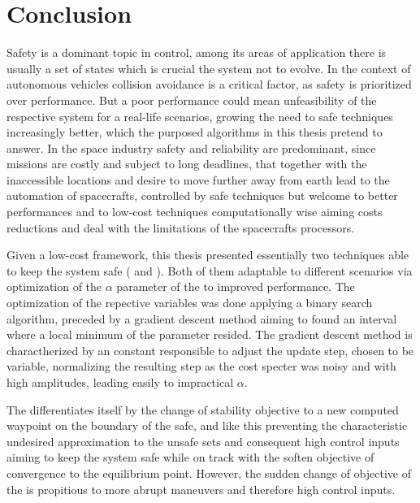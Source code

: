 
%

\chapter{Conclusion}
\label{cha:conclusion}

Safety is a dominant topic in control, among its areas of application there is usually a set of states which is crucial the system not to evolve. In the context of autonomous vehicles collision avoidance is a critical factor, as safety is prioritized over performance. But a poor performance could mean unfeasibility of the respective system for a real-life scenarios, growing the need to safe techniques increasingly better, which the purposed algorithms in this thesis pretend to answer. In the space industry safety and reliability are predominant, since missions are costly and subject to long deadlines, that together with the inaccessible locations and desire to move further away from earth lead to the automation of spacecrafts, controlled by safe techniques but welcome to better performances and to low-cost techniques computationally wise aiming costs reductions and deal with the limitations of the spacecrafts processors.


Given a low-cost  framework, this thesis presented essentially two techniques able to keep the system safe ( and ). Both of them adaptable to different scenarios via optimization of the \(\alpha\) parameter of the  to improved performance. The optimization of the repective variables was done applying a binary search algorithm, preceded by a gradient descent method aiming to found an interval where a local minimum of the parameter resided. The gradient descent method is charactherized by an constant responsible to adjust the update step, chosen to be variable, normalizing the resulting step as the cost specter was noisy and with high amplitudes, leading easily to impractical \(\alpha\). 


The  differentiates itself by the change of stability objective to a new computed waypoint on the boundary of the safe, and like this preventing the characteristic  undesired approximation to the unsafe sets and consequent high control inputs aiming to keep the system safe while on track with the soften objective of convergence to the equilibrium point. However, the sudden change of objective of the  is propitious to more abrupt maneuvers and therefore high control inputs.   


